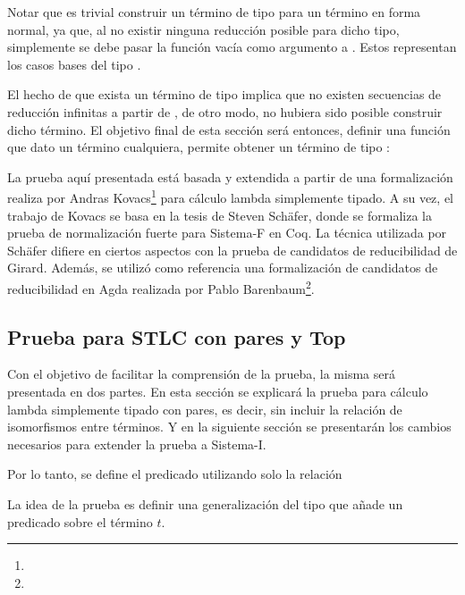 Notar que es trivial construir un término de tipo  para un término en forma normal, ya que, al no existir ninguna reducción posible para dicho tipo, simplemente se debe pasar la función vacía como argumento a .
Estos representan los casos bases del tipo .

El hecho de que exista un término de tipo   implica que no existen secuencias de reducción infinitas a partir de , de otro modo, no hubiera sido posible construir dicho término.
El objetivo final de esta sección será entonces, definir una función que dato un término cualquiera, permite obtener un término de tipo  :

\AgdaSymbol{:}
\AgdaSymbol{\{}
\AgdaSymbol{\}}
\AgdaSymbol{(}
\AgdaSymbol{:}
\AgdaSymbol{)}

La prueba aquí presentada está basada y extendida a partir de una formalización realiza por 
Andras Kovacs\footnote{} para cálculo lambda simplemente tipado.
A su vez, el trabajo de Kovacs se basa en la tesis de Steven Schäfer\cite{Schafer}, donde se formaliza la prueba de normalización fuerte para Sistema-F en Coq.
La técnica utilizada por Schäfer difiere en ciertos aspectos con la prueba de candidatos de reducibilidad de Girard\cite{Girard}.
Además, se utilizó como referencia una formalización de candidatos de reducibilidad en Agda realizada por Pablo Barenbaum\footnote{}.

\subsection{Prueba para STLC con pares y Top}

Con el objetivo de facilitar la comprensión de la prueba, la misma será presentada en dos partes.
En esta sección se explicará la prueba para cálculo lambda simplemente tipado con pares, es decir, sin incluir la relación de isomorfismos entre términos.
Y en la siguiente sección se presentarán los cambios necesarios para extender la prueba a Sistema-I.


Por lo tanto, se define el predicado  utilizando solo la relación \type{$\_\hookrightarrow\_$}


La idea de la prueba es definir una generalización del tipo  que añade un predicado sobre el término $t$.

